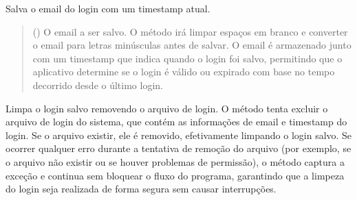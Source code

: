 \documentclass[letterpaper,10pt,english]{sphinxmanual}
\begin{document}

\begin{fulllineitems}
\label{\detokenize{api/user_login:user_login.save_login}}
\pysigstartsignatures
\pysiglinewithargsret
{}
{}
{}
\pysigstopsignatures
\sphinxAtStartPar
Salva o e\sphinxhyphen{}mail do login com um timestamp atual.
\begin{quote}\begin{description}
\sphinxAtStartPar
{} () \textendash{} O e\sphinxhyphen{}mail a ser salvo. O método irá limpar espaços em branco e converter o e\sphinxhyphen{}mail para letras minúsculas antes de salvar. O e\sphinxhyphen{}mail é armazenado junto com um timestamp que indica quando o login foi salvo, permitindo que o aplicativo determine se o login é válido ou expirado com base no tempo decorrido desde o último login.

\sphinxAtStartPar
{}

\end{description}\end{quote}

\end{fulllineitems}


\begin{fulllineitems}
\label{\detokenize{api/user_login:user_login.clear_login}}
\pysigstartsignatures
\pysiglinewithargsret
{}
{}
{}
\pysigstopsignatures
\sphinxAtStartPar
Limpa o login salvo removendo o arquivo de login. O método tenta excluir o arquivo de login do sistema, que contém as informações de e\sphinxhyphen{}mail e timestamp do login. Se o arquivo existir, ele é removido, efetivamente limpando o login salvo. Se ocorrer qualquer erro durante a tentativa de remoção do arquivo (por exemplo, se o arquivo não existir ou se houver problemas de permissão), o método captura a exceção e continua sem bloquear o fluxo do programa, garantindo que a limpeza do login seja realizada de forma segura sem causar interrupções.
\begin{quote}\begin{description}
\sphinxAtStartPar
{}

\end{description}\end{quote}

\end{fulllineitems}
\end{document}
